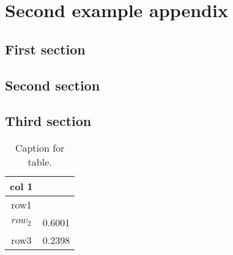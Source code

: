 \chapter{Second example appendix}

\section{First section}

\lipsum[1-2]

\section{Second section}

\lipsum[1-2]

\section{Third section}

\lipsum[1-2]

\begin{table}[H]
	\center
	\caption{Caption for table.}
	\label{tab:table-1}
	\begin{tabular}{cC}
		\toprule
		col 1   &  \\
		\midrule
		row1    & \cos \theta  \\
		$row_2$ & 0.6001       \\
		row3    & 0.2398       \\
		\bottomrule
	\end{tabular}
\end{table}


